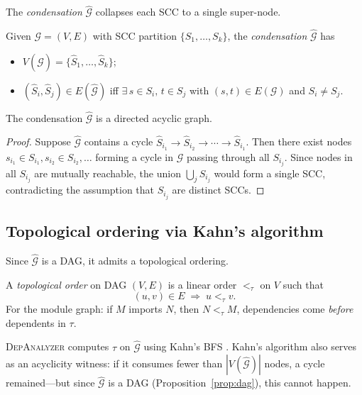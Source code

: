 \documentclass[11pt]{article}
\newcommand{\IG}{\mathcal{G}}              %
\newcommand{\DA}{\textsc{DepAnalyzer}}     %
\newcommand{\TopoOrd}{\tau}                %
\newcommand{\CondGraph}{\widehat{\IG}}     %
\begin{document}
The \emph{condensation} $\CondGraph$ collapses each SCC to a single
super-node.

\begin{definition}[Condensation]
\label{def:condensation}
Given $\IG = (V, E)$ with SCC partition $\{S_1, \ldots, S_k\}$, the
\emph{condensation} $\CondGraph$ has
\begin{itemize}
  \item $V(\CondGraph) = \{\hat{S}_1, \ldots, \hat{S}_k\}$;
  \item $(\hat{S}_i, \hat{S}_j) \in E(\CondGraph)$ iff
        $\exists\, s \in S_i,\, t \in S_j$ with
        $(s, t) \in E(\IG)$ and $S_i \neq S_j$.
\end{itemize}
\end{definition}

\begin{proposition}[DAG property of $\CondGraph$]
\label{prop:dag}
The condensation $\CondGraph$ is a directed acyclic graph.
\end{proposition}

\begin{proof}
Suppose $\CondGraph$ contains a cycle
$\hat{S}_{i_1} \to \hat{S}_{i_2} \to \cdots \to \hat{S}_{i_1}$.
Then there exist nodes $s_{i_1} \in S_{i_1}, s_{i_2} \in S_{i_2},
\ldots$ forming a cycle in $\IG$ passing through all $S_{i_j}$.
Since nodes in all $S_{i_j}$ are mutually reachable, the union
$\bigcup_j S_{i_j}$ would form a single SCC, contradicting the
assumption that $S_{i_j}$ are distinct SCCs.
\end{proof}

\subsection{Topological ordering via Kahn's algorithm}

Since $\CondGraph$ is a DAG, it admits a topological ordering.

\begin{definition}
\label{def:topo-order}
A \emph{topological order} on DAG $(V, E)$ is a linear order
$<_{\TopoOrd}$ on $V$ such that
\[
  (u, v) \in E \;\Longrightarrow\; u <_{\TopoOrd} v.
\]
For the module graph: if $M$ imports $N$, then $N <_{\TopoOrd} M$,
\ie dependencies come \emph{before} dependents in $\TopoOrd$.
\end{definition}

\DA{} computes $\TopoOrd$ on $\CondGraph$ using Kahn's BFS
\cite{kahn}.  Kahn's algorithm also serves as an acyclicity witness:
if it consumes fewer than $|V(\CondGraph)|$ nodes, a cycle remained—but
since $\CondGraph$ is a DAG (Proposition~\ref{prop:dag}), this cannot
happen.
\end{document}
